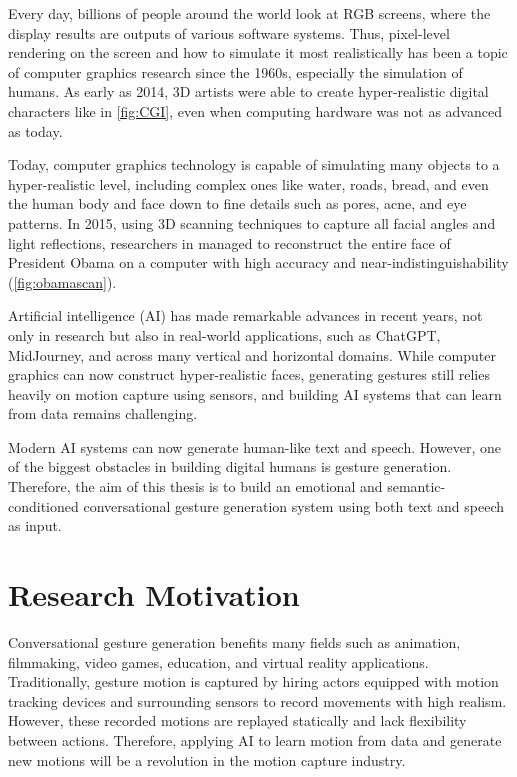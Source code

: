 Every day, billions of people around the world look at RGB screens, where the display results are outputs of various software systems. Thus, pixel-level rendering on the screen and how to simulate it most realistically has been a topic of computer graphics research since the 1960s, especially the simulation of humans. As early as 2014, 3D artists were able to create hyper-realistic digital characters like in \autoref{fig:CGI}, even when computing hardware was not as advanced as today.

Today, computer graphics technology is capable of simulating many objects to a hyper-realistic level, including complex ones like water, roads, bread, and even the human body and face down to fine details such as pores, acne, and eye patterns. In 2015, using 3D scanning techniques to capture all facial angles and light reflections, researchers in \cite{metallo2015scanning} managed to reconstruct the entire face of President Obama on a computer with high accuracy and near-indistinguishability (\autoref{fig:obamascan}).

Artificial intelligence (AI) has made remarkable advances in recent years, not only in research but also in real-world applications, such as ChatGPT, MidJourney, and across many vertical and horizontal domains. While computer graphics can now construct hyper-realistic faces, generating gestures still relies heavily on motion capture using sensors, and building AI systems that can learn from data remains challenging.

Modern AI systems can now generate human-like text and speech. However, one of the biggest obstacles in building digital humans is gesture generation. Therefore, the aim of this thesis is to build an emotional and semantic-conditioned conversational gesture generation system using both text and speech as input.

\section{Research Motivation}

Conversational gesture generation benefits many fields such as animation, filmmaking, video games, education, and virtual reality applications. Traditionally, gesture motion is captured by hiring actors equipped with motion tracking devices and surrounding sensors to record movements with high realism. However, these recorded motions are replayed statically and lack flexibility between actions. Therefore, applying AI to learn motion from data and generate new motions will be a revolution in the motion capture industry.

